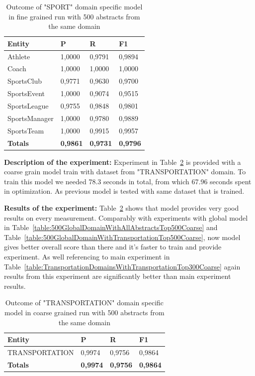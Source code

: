 \documentclass[thesis=M,english]{FITthesis}[2018/05/30]
\begin{document}
	\begin{table}[H]\centering
		\begin{tabular}{|l|l|l|l|}
			\hline {\textbf{Entity}} & {\textbf{P}} & {\textbf{R}} & {\textbf{F1}}\\\hline
				Athlete & 1,0000 & 0,9791 & 0,9894\\
				Coach & 1,0000 & 1,0000 & 1,0000\\
				SportsClub & 0,9771 & 0,9630 & 0,9700\\
				SportsEvent & 1,0000 & 0,9074 & 0,9515\\
				SportsLeague & 0,9755 & 0,9848 & 0,9801\\
				SportsManager & 1,0000 & 0,9780 & 0,9889\\				
				SportsTeam & 1,0000 & 0,9915 & 0,9957\\\hline
				\textbf{Totals} & \textbf{0,9861} & \textbf{0,9731} & \textbf{0,9796}\\\hline
		\end{tabular}
		\caption{Outcome of "SPORT" domain specific model in fine grained run with 500 abstracts from the same domain \label{table:500SportDomainWithSportTop500Fine}}
	\end{table}	

	\textbf{Description of the experiment:} Experiment in Table~\ref{table:500TransportationDomainWithTransportationTop500Coarse} is provided with a coarse grain model train with dataset from "TRANSPORTATION" domain. To train this model we needed 78.3 seconds in total, from which 67.96 seconds spent in optimization. As previous model is tested with same dataset that is trained.

	\textbf{Results of the experiment:} Table~\ref{table:500TransportationDomainWithTransportationTop500Coarse} shows that model provides very good results on every measurement. Comparably with experiments with global model in Table~\ref{table:500GlobalDomainWithAllAbstractsTop500Coarse} and Table~\ref{table:500GlobalDomainWithTransportationTop500Coarse}, now model gives better overall score than there and it's faster to train and provide experiment. As well referencing to main experiment in Table~\ref{table:TransportationDomainsWithTransportationTop300Coarse} again results from this experiment are significantly better than main experiment results.


	\begin{table}[H]\centering
		\begin{tabular}{|l|l|l|l|}
			\hline {\textbf{Entity}} & {\textbf{P}} & {\textbf{R}} & {\textbf{F1}}\\\hline
				TRANSPORTATION & 0,9974 & 0,9756 & 0,9864\\\hline
				\textbf{Totals} & \textbf{0,9974} & \textbf{0,9756} & \textbf{0,9864}\\\hline
		\end{tabular}
		\caption{Outcome of "TRANSPORTATION" domain specific model in coarse grained run with 500 abstracts from the same domain \label{table:500TransportationDomainWithTransportationTop500Coarse}}
	\end{table}
	
\end{document}
